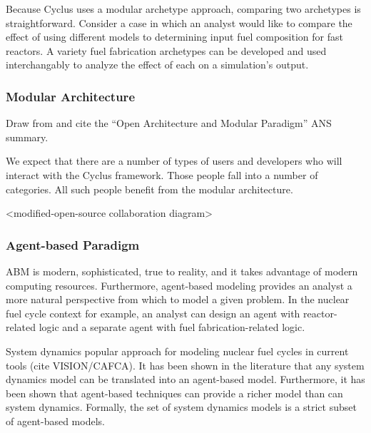 Because Cyclus uses a modular archetype approach, comparing two archetypes is
straightforward. Consider a case in which an analyst would like to compare the
effect of using different models to determining input fuel composition for fast
reactors. A variety fuel fabrication archetypes can be developed and used
interchangably to analyze the effect of each on a simulation's output.

\subsubsection{Modular Architecture}

Draw from and cite the ``Open Architecture and Modular Paradigm'' ANS summary.

We expect that there are a number of types of users and developers who will 
interact with the Cyclus framework. Those people fall into a number of 
categories. All such people benefit from the modular architecture. 

<modified-open-source collaboration diagram>

\subsubsection{Agent-based Paradigm}

ABM is modern, sophisticated, true to reality, and it takes advantage of modern
computing resources. Furthermore, agent-based modeling provides an analyst a
more natural perspective from which to model a given problem. In the nuclear
fuel cycle context for example, an analyst can design an agent with
reactor-related logic and a separate agent with fuel fabrication-related logic.

System dynamics popular approach for modeling nuclear fuel cycles in current
tools (cite VISION/CAFCA). It has been shown in the literature
\cite{macal_agent-based_2010} that any system dynamics model can be translated
into an agent-based model. Furthermore, it has been shown that agent-based
techniques can provide a richer model than can system dynamics. Formally, the
set of system dynamics models is a strict subset of agent-based models.

